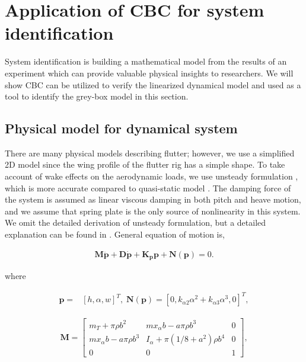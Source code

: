 \documentclass[openacc]{rsproca_new}%
\def\vec#1{\ensuremath{\mathbf{#1}}}
\begin{document}
\section{Application of CBC for system identification}
System identification is building a mathematical model from the results of an experiment which can provide valuable physical insights to researchers. We will show CBC can be utilized to verify the linearized dynamical model and used as a tool to identify the grey-box model \cite{bohlin2006practical} in this section.

\subsection{Physical model for dynamical system}\label{model}
There are many physical models describing flutter; however, we use a simplified 2D model since the wing profile of the flutter rig has a simple shape. To take account of wake effects on the aerodynamic loads, we use unsteady formulation \cite{abdelkefi2013analytical}, which is more accurate compared to quasi-static model \cite{strganac2000identification}. The damping force of the system is assumed as linear viscous damping in both pitch and heave motion, and we assume that spring plate is the only source of nonlinearity in this system. We omit the detailed derivation of unsteady formulation, but a detailed explanation can be found in \cite{abdelkefi2013analytical}. General equation of motion is,

\begin{align}\label{eq:2-1}
\vec{M} \ddot{\vec{p}} + \vec{D} \dot{\vec{p}} +\vec{K_p} \vec{p} + \vec{N}(\vec{p}) =0.
\end{align}

\noindent where

\begin{align}\label{eq:2-2}
\vec{p}=&[h,\alpha,w]^T, \; \vec{N}(\vec{p})=[0,k_{\alpha 2}\alpha^2+k_{\alpha 3}\alpha^3,0]^T,
\end{align}

\begin{align}\label{eq:2-3}
\vec{M}=
\begin{bmatrix}
    m_T+\pi \rho b^2       & m x_\alpha b-a\pi\rho b^3 & 0 \\
    m x_\alpha b-a\pi\rho b^3       & I_\alpha+\pi(1/8+a^2)\rho b^4 & 0 \\
    0       & 0 & 1
\end{bmatrix},
\end{align}
\end{document}

